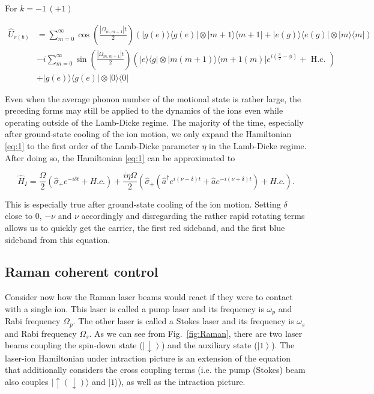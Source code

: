 For $k=-1\, (+1)$

\begin{equation}
    \begin{aligned}
        \hat{U}_{r(b)} & =\sum_{m=0}^{\infty} \cos \left(\frac{\left|\Omega_{m, m+1}\right| t}{2}\right)(|g(e)\rangle\langle g(e)|\otimes| m+1\rangle\langle m+1|+| e(g)\rangle\langle e(g)|\otimes| m\rangle\langle m|)            \\
                       & -i \sum_{m=0}^{\infty} \sin \left(\frac{\left|\Omega_{m, m+1}\right| t}{2}\right)\left(|e\rangle\langle g|\otimes| m(m+1)\rangle\langle m+1(m)| e^{i\left(\frac{\pi}{2}-\phi\right)}+\text { H.c. }\right)
        \\
                       & +|g(e)\rangle\langle g(e)|\otimes| 0\rangle\langle 0|
    \end{aligned}
\end{equation}

Even when the average phonon number of the motional state is rather large, the preceding forms may still be applied to the dynamics of the ions even while operating outside of the Lamb-Dicke regime. The majority of the time, especially after ground-state cooling of the ion motion, we only expand the Hamiltonian \eqref{eq:1} to the first order of the Lamb-Dicke parameter $\eta$ in the Lamb-Dicke regime. After doing so, the Hamiltonian \eqref{eq:1} can be approximated to

\begin{equation}
    \label{10}
    \hat{H}_I=\frac{\Omega}{2} (\hat{\sigma}_+ e^{-i\delta t}+H.c.) +\frac{i\eta\Omega}{2}\left(\hat{\sigma}_+ (\hat{a}^\dagger e^{i(\nu-\delta) t} + \hat{a}e^{-i(\nu+\delta) t})+H.c.\right).
\end{equation}

This is especially true after ground-state cooling of the ion motion. Setting $\delta$ close to $0$, $-\nu$ and $\nu$ accordingly and disregarding the rather rapid rotating terms allows us to quickly get the carrier, the first red sideband, and the first blue sideband from this equation.

\subsection{Raman coherent control}

Consider now how the Raman laser beams would react if they were to contact with a single ion. This laser is called a pump laser and its frequency is $\omega_p$ and Rabi frequency $\Omega_p$. The other laser is called a Stokes laser and its frequency is $\omega_s$ and Rabi frequency $\Omega_s$. As we can see from Fig.~\ref{fig:Raman}, there are two laser beams coupling the spin-down state ($\left|\downarrow\right\rangle$) and the auxiliary state ($\left|1\right\rangle$). The laser-ion Hamiltonian under intraction picture is an extension of the equation that additionally considers the cross coupling terms (i.e. the pump (Stokes) beam also couples $|\uparrow(\downarrow)\rangle$ and $|1\rangle$), as well as the intraction picture.

